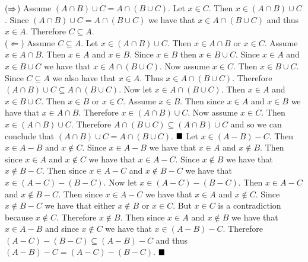 \documentclass[12pt]{book}
\begin{document}
{($\then$) Assume $(A \cap B) \cup C = A \cap (B \cup C)$. Let $x \in C$. Then $x \in (A \cap B) \cup C$. Since $(A \cap B) \cup C = A \cap (B \cup C)$ we have that $x \in A \cap (B \cup C)$ and thus $x \in A$. Therefore $C \subseteq A$.\\ ($\Leftarrow$) Assume $C \subseteq A$. Let $x \in (A \cap B) \cup C$. Then $x \in A \cap B$ or $x \in C$. Assume $x \in A \cap B$. Then $x \in A$ and $x \in B$. Since $x \in B$ then $x \in B \cup C$. Since $x \in A$ and $x \in B \cup C$ we have that $x \in A \cap (B \cup C)$. Now assume $x \in C$. Then $x \in B \cup C$. Since $C \subseteq A$ we also have that $x \in A$. Thus $x \in A \cap (B \cup C)$. Therefore $(A \cap B) \cup C \subseteq A \cap (B \cup C)$. Now let $x \in A \cap (B \cup C)$. Then $x \in A$ and $x \in B \cup C$. Then $x \in B$ or $x \in C$. Assume $x \in B$. Then since $x \in A$ and $x \in B$ we have that $x \in A \cap B$. Therefore $x \in (A \cap B) \cup C$. Now assume $x \in C$. Then $x \in (A \cap B) \cup C$. Therefore $A \cap (B \cup C) \subseteq (A \cap B) \cup C$ and so we can conclude that $(A \cap B) \cup C = A \cap (B \cup C)$. $\qed$}
{Let $x \in (A - B) - C$. Then $x \in A - B$ and $x \notin C$. Since $x \in A - B$ we have that $x \in A$ and $x \notin B$. Then since $x \in A$ and $x \notin C$ we have that $x \in A - C$. Since $x \notin B$ we have that $x \notin B - C$. Then since $x \in A - C$ and $x \notin B - C$ we have that $x \in (A - C) - (B - C)$. Now let $x \in (A - C) - (B - C)$. Then $x \in A - C$ and $x \notin B - C$. Then since $x \in A - C$ we have that $x \in A$ and $x \notin C$. Since $x \notin B - C$ we have that either $x \notin B$ or $x \in C$. But $x \in C$ is a contradiction because $x \notin C$. Therefore $x \notin B$. Then since $x \in A$ and $x \notin B$ we have that $x \in A - B$ and since $x \notin C$ we have that $x \in (A - B) - C$. Therefore $(A - C) - (B - C) \subseteq (A - B) - C$ and thus $(A - B) - C = (A - C) - (B - C)$. $\qed$}
\end{document}
